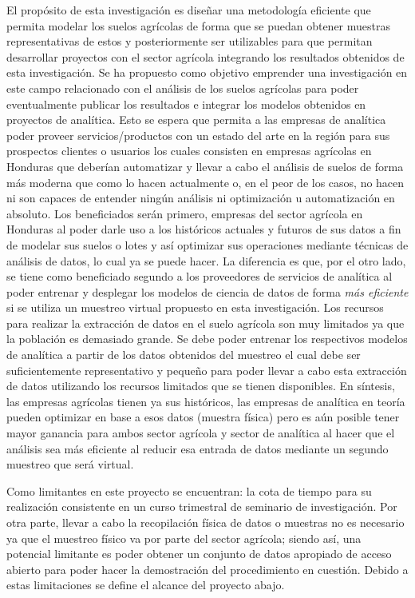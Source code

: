 \documentclass{report}
\begin{document}
El propósito de esta investigación es diseñar una metodología eficiente que permita modelar los suelos agrícolas de forma que se puedan obtener muestras representativas de estos y posteriormente ser utilizables para que permitan desarrollar proyectos con el sector agrícola integrando los resultados obtenidos de esta investigación. Se ha propuesto como objetivo emprender una investigación en este campo relacionado con el análisis de los suelos agrícolas para poder eventualmente publicar los resultados e integrar los modelos obtenidos en proyectos de analítica. Esto se espera que permita a las empresas de analítica poder proveer servicios/productos con un estado del arte en la región para sus prospectos clientes o usuarios los cuales consisten en empresas agrícolas en Honduras que deberían automatizar y llevar a cabo el análisis de suelos de forma más moderna que como lo hacen actualmente o, en el peor de los casos, no hacen ni son capaces de entender ningún análisis ni optimización u automatización en absoluto. Los beneficiados serán primero, empresas del sector agrícola en Honduras al poder darle uso a los históricos actuales y futuros de sus datos a fin de modelar sus suelos o lotes y así optimizar sus operaciones mediante técnicas de análisis de datos, lo cual ya se puede hacer. La diferencia es que, por el otro lado, se tiene como beneficiado segundo a los proveedores de servicios de analítica al poder entrenar y desplegar los modelos de ciencia de datos de forma \textit{más eficiente} si se utiliza un muestreo virtual propuesto en esta investigación. Los recursos para realizar la extracción de datos en el suelo agrícola son muy limitados ya que la población es demasiado grande. Se debe poder entrenar los respectivos modelos de analítica a partir de los datos obtenidos del muestreo el cual debe ser suficientemente representativo y pequeño para poder llevar a cabo esta extracción de datos utilizando los recursos limitados que se tienen disponibles. En síntesis, las empresas agrícolas tienen ya sus históricos, las empresas de analítica en teoría pueden optimizar en base a esos datos (muestra física) pero es aún posible tener mayor ganancia para ambos sector agrícola y sector de analítica al hacer que el análisis sea más eficiente al reducir esa entrada de datos mediante un segundo muestreo que será virtual.

\bigbreak

Como limitantes en este proyecto se encuentran: la cota de tiempo para su realización consistente en un curso trimestral de seminario de investigación. Por otra parte, llevar a cabo la recopilación física de datos o muestras no es necesario ya que el muestreo físico va por parte del sector agrícola; siendo así, una potencial limitante es poder obtener un conjunto de datos apropiado de acceso abierto para poder hacer la demostración del procedimiento en cuestión. Debido a estas limitaciones se define el alcance del proyecto abajo.
\end{document}
